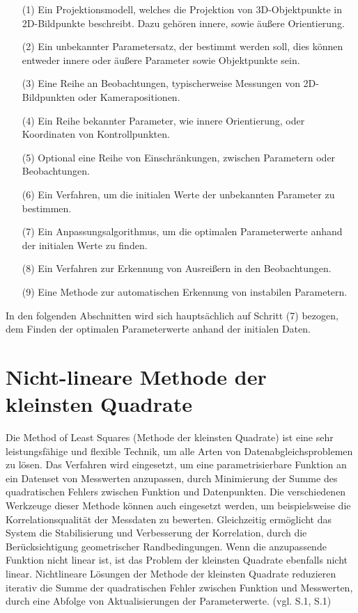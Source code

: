 \begin{itemize}
\item[(1)] Ein Projektionsmodell, welches die Projektion von 3D-Objektpunkte in 2D-Bildpunkte beschreibt. Dazu gehören innere, sowie äußere Orientierung.

\item[(2)] Ein unbekannter Parametersatz, der bestimmt werden soll, dies können entweder innere oder äußere Parameter sowie Objektpunkte sein.

\item[(3)] Eine Reihe an Beobachtungen, typischerweise Messungen von 2D-Bildpunkten oder Kamerapositionen.

\item[(4)] Ein Reihe bekannter Parameter, wie innere Orientierung, oder Koordinaten von Kontrollpunkten.

\item[(5)] Optional eine Reihe von Einschränkungen, zwischen Parametern oder Beobachtungen.

\item[(6)] Ein Verfahren, um die initialen Werte der unbekannten Parameter zu bestimmen.

\item[(7)] Ein Anpassungsalgorithmus, um die optimalen Parameterwerte anhand der initialen Werte zu finden.

\item[(8)] Ein Verfahren zur Erkennung von Ausreißern in den Beobachtungen.

\item[(9)] Eine Methode zur automatischen Erkennung von instabilen Parametern.

\end{itemize}

In den folgenden Abschnitten wird sich hauptsächlich auf Schritt (7) bezogen, dem Finden der optimalen Parameterwerte anhand der initialen Daten.

\section{Nicht-lineare Methode der kleinsten Quadrate}
Die \glqq Method of Least Squares\grqq{} (Methode der kleinsten Quadrate) ist eine sehr leistungsfähige und flexible Technik, um alle Arten von Datenabgleichsproblemen zu lösen. Das Verfahren wird eingesetzt, um eine parametrisierbare Funktion an ein Datenset von Messwerten anzupassen, durch Minimierung der Summe des quadratischen Fehlers zwischen Funktion und Datenpunkten. Die verschiedenen Werkzeuge dieser Methode können auch eingesetzt werden, um beispielsweise die Korrelationsqualität der Messdaten zu bewerten. Gleichzeitig ermöglicht das System die Stabilisierung und Verbesserung der Korrelation, durch die Berücksichtigung geometrischer Randbedingungen. Wenn die anzupassende Funktion nicht linear ist, ist das Problem der kleinsten Quadrate ebenfalls nicht linear. Nichtlineare Lösungen der Methode der kleinsten Quadrate reduzieren iterativ die Summe der quadratischen Fehler zwischen Funktion und Messwerten, durch eine Abfolge von Aktualisierungen der Parameterwerte. (vgl. \cite{least_quares} S.1, \cite{lev_mar} S.1)

